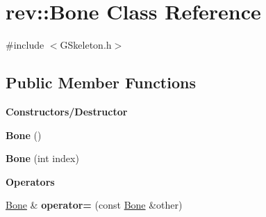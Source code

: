 \hypertarget{classrev_1_1_bone}{}\section{rev\+::Bone Class Reference}
\label{classrev_1_1_bone}


{\ttfamily \#include $<$G\+Skeleton.\+h$>$}

\subsection*{Public Member Functions}
\begin{Indent}\textbf{ Constructors/\+Destructor}\par
\begin{DoxyCompactItemize}
\item 
\mbox{\label{classrev_1_1_bone_ab5e4ad780e922cc78057b9834b828787}} 
{\bfseries Bone} ()
\item 
\mbox{\label{classrev_1_1_bone_a63a45ca871ecf0edeb23123181c0cec3}} 
{\bfseries Bone} (int index)
\end{DoxyCompactItemize}
\end{Indent}
\begin{Indent}\textbf{ Operators}\par
\begin{DoxyCompactItemize}
\item 
\mbox{\label{classrev_1_1_bone_aefd6cbe26f784141998fd9ed8d0fb302}} 
\mbox{\hyperlink{classrev_1_1_bone}{Bone}} \& {\bfseries operator=} (const \mbox{\hyperlink{classrev_1_1_bone}{Bone}} \&other)
\end{DoxyCompactItemize}
\end{Indent}
